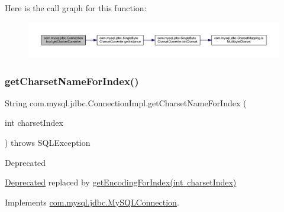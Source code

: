 Here is the call graph for this function\+:\nopagebreak
\begin{figure}[H]
\begin{center}
\leavevmode
\includegraphics[width=350pt]{classcom_1_1mysql_1_1jdbc_1_1_connection_impl_a641ccc3402b1c74a6f3bb9422cfc758b_cgraph}
\end{center}
\end{figure}
\mbox{\label{classcom_1_1mysql_1_1jdbc_1_1_connection_impl_a2585f67a62bdf6127174e9f7dbc8a0b6}} 
\subsubsection{\texorpdfstring{get\+Charset\+Name\+For\+Index()}{getCharsetNameForIndex()}}
{\footnotesize\ttfamily String com.\+mysql.\+jdbc.\+Connection\+Impl.\+get\+Charset\+Name\+For\+Index (\begin{DoxyParamCaption}\item[{int}]{charset\+Index }\end{DoxyParamCaption}) throws S\+Q\+L\+Exception}

\begin{DoxyRefDesc}{Deprecated}
\item[\mbox{\hyperlink{deprecated__deprecated000008}{Deprecated}}]replaced by {\ttfamily \mbox{\hyperlink{classcom_1_1mysql_1_1jdbc_1_1_connection_impl_a66f46efa858fb96251057b1dd48ad028}{get\+Encoding\+For\+Index(int charset\+Index)}}} \end{DoxyRefDesc}


Implements \mbox{\hyperlink{interfacecom_1_1mysql_1_1jdbc_1_1_my_s_q_l_connection_a22f366874501fa1c71054ad89fc56b32}{com.\+mysql.\+jdbc.\+My\+S\+Q\+L\+Connection}}.

